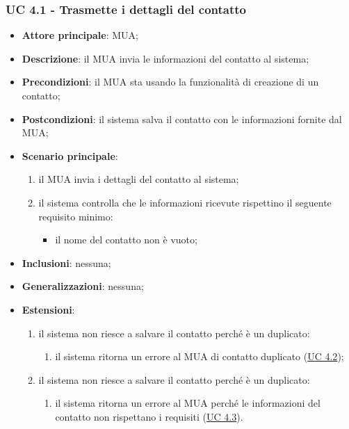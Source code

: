 \subsubsection{UC 4.1 - Trasmette i dettagli del contatto} \label{sec:UC4.1}
    \begin{itemize}
        \item \textbf{Attore principale}: MUA;
        \item \textbf{Descrizione}: il MUA invia le informazioni del contatto al sistema;
        \item \textbf{Precondizioni}: il MUA sta usando la funzionalità di creazione di un contatto;
        \item \textbf{Postcondizioni}: il sistema salva il contatto con le informazioni fornite dal MUA;
        \item \textbf{Scenario principale}:
            \begin{enumerate}
                \item il MUA invia i dettagli del contatto al sistema;
                \item il sistema controlla che le informazioni ricevute rispettino il seguente requisito minimo:
                    \begin{itemize}
                        \item il nome del contatto non è vuoto;
                    \end{itemize}
            \end{enumerate}
        \item \textbf{Inclusioni}: nessuna;
        \item \textbf{Generalizzazioni}: nessuna;
        \item \textbf{Estensioni}:
            \begin{enumerate}[label=\alph*.]
                \item il sistema non riesce a salvare il contatto perché è un duplicato:
                \begin{enumerate}[label=\arabic*.]
                    \item il sistema ritorna un errore al MUA di contatto duplicato (\hyperref[sec:UC4.2]{UC 4.2});
                \end{enumerate}
                \item il sistema non riesce a salvare il contatto perché è un duplicato:
                \begin{enumerate}[label=\arabic*.]
                    \item il sistema ritorna un errore al MUA perché le informazioni del contatto non rispettano i requisiti (\hyperref[sec:UC4.3]{UC 4.3}).
                \end{enumerate}
            \end{enumerate}
    \end{itemize}


